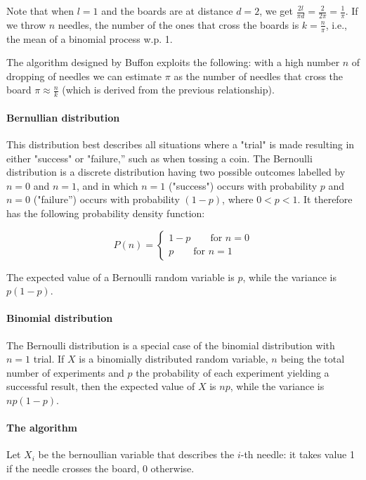 

Note that when $l = 1$ and the boards are at distance $d = 2$, we get $\frac{2l}{\pi d} = \frac{2}{2 \pi} = \frac{1}{\pi}$. If we throw $n$ needles, the number of the ones that cross the boards is $k = \frac{n}{\pi}$, i.e., the mean of a binomial process w.p. 1.

The algorithm designed by Buffon exploits the following: with a high number $n$ of dropping of needles we can estimate $\pi$ as the number of needles that cross the board $\pi \approx \frac{n}{k}$ (which is derived from the previous relationship).

\paragraph{Bernullian distribution}
This distribution best describes all situations where a "trial" is made resulting in either "success" or "failure,” such as when tossing a coin. The Bernoulli distribution is a discrete distribution having two possible outcomes labelled by $n=0$ and $n=1$, and in which $n=1$ ("success") occurs with probability $p$ and $n=0$ ("failure”) occurs with probability $(1-p)$, where $0<p<1$. It therefore has the following probability density function:

$$
P(n) = \begin{cases}
    1-p \qquad \text{for } n = 0 \\
    p \qquad \text{for } n = 1
\end{cases}
$$

The expected value of a Bernoulli random variable is $p$, while the variance is $p (1-p)$.

\paragraph{Binomial distribution}
The Bernoulli distribution is a special case of the binomial distribution with $n=1$ trial. If $X$ is a binomially distributed random variable, $n$ being the total number of experiments and $p$ the probability of each experiment yielding a successful result, then the expected value of $X$ is $n p$, while the variance is $n p (1-p)$.

\paragraph{The algorithm}
Let $X_i$ be the bernoullian variable that describes the $i$-th needle: it takes value 1 if the needle crosses the board, 0 otherwise.

